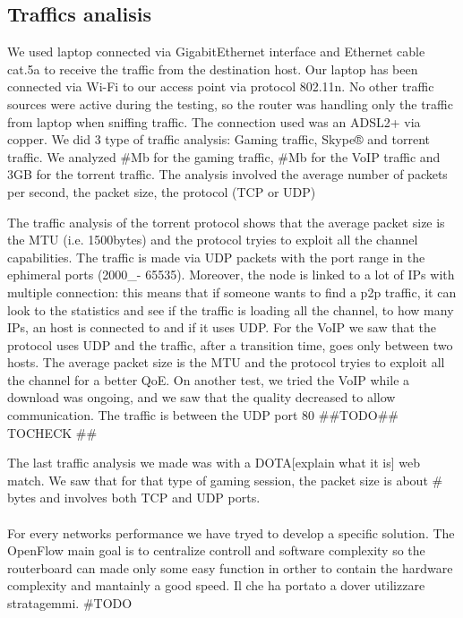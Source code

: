 \documentclass[conference,10pt]{IEEEtran}
\begin{document}
  \subsection{Traffics analisis}\label{subsec:traf}
  We used laptop connected via
GigabitEthernet interface and Ethernet cable cat.5a to receive the traffic from the destination host.
Our laptop has been connected via Wi-Fi to our access point via protocol 802.11n.
No other traffic sources were active during the testing, so the router was handling only
the traffic from laptop when sniffing traffic. The connection used was an ADSL2+ via copper.
We did 3 type of traffic analysis: Gaming traffic, Skype® and torrent traffic. We analyzed
\#Mb for the gaming traffic, \#Mb for the VoIP traffic and 3GB for the torrent traffic.
The analysis involved the average number of packets per second, the packet size, the protocol (TCP or UDP)

The traffic analysis of the torrent protocol shows that the average packet size is the MTU
(i.e. 1500bytes) and the protocol tryies to exploit all the channel capabilities. The traffic
is made via UDP packets with the port range in the ephimeral ports (2000_- 65535).
Moreover, the node is linked to a lot of IPs with multiple connection: this means that
if someone wants to find a p2p traffic, it can look to the statistics and see if the traffic is loading all the channel,
to how many IPs, an host is connected to and if it uses UDP.
For the VoIP we saw that the protocol uses UDP and the traffic, after a transition time, goes only between two hosts.
The average packet size is the MTU and the protocol tryies to exploit all the channel for a better QoE.
On another test, we tried the VoIP while a download was ongoing, and we saw that the quality
decreased to allow communication. The traffic is between the UDP port 80 \#\#TODO\#\# TOCHECK \#\#

The last traffic analysis we made was with a DOTA[explain what it is] web match.
We saw that for that type of gaming session, the packet size is about \# bytes and involves both TCP and UDP ports.
  \\
  \\
  For every networks performance we have tryed to develop a specific solution. The OpenFlow main goal is to centralize controll and software
  complexity so the routerboard can made only some easy function in orther to contain the hardware complexity and mantainly a good speed\cite{qos_paper}.
  Il che ha portato a dover utilizzare stratagemmi.
  \#TODO %
\end{document}
